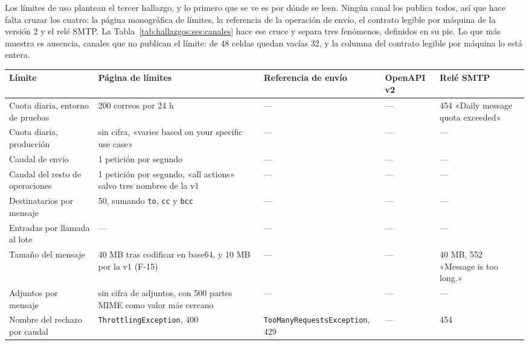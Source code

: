 Los límites de uso plantean el tercer hallazgo, y lo primero que se ve es por
dónde se leen. Ningún canal los publica todos, así que hace falta cruzar los
cuatro: la página monográfica de límites, la referencia de la operación de
envío, el contrato legible por máquina de la versión 2 y el relé SMTP. La
Tabla~\ref{tab:hallazgos:ses:canales} hace ese cruce y separa tres fenómenos,
definidos en su pie. Lo que más muestra es ausencia, canales que no publican
el límite: de 48 celdas quedan vacías 32, y la columna del contrato legible
por máquina lo está entera.

\begin{table}[H]
\centering
\scriptsize
\setlength{\tabcolsep}{3pt}
\renewcommand{\arraystretch}{1.15}
\begin{tabular}{|p{}|p{}|p{}|p{}|p{}|}
\hline
\raggedright \textbf{Límite} & \raggedright \textbf{Página de límites} & \raggedright \textbf{Referencia de envío} & \raggedright \textbf{OpenAPI v2} & \raggedright \textbf{Relé SMTP} \tabularnewline
\hline
\raggedright Cuota diaria, entorno de pruebas & \raggedright 200 correos por 24 h & \raggedright --- & \raggedright --- & \raggedright 454 «Daily message quota exceeded» \tabularnewline
\hline
\raggedright Cuota diaria, producción & \raggedright sin cifra, «varies based on your specific use case» & \raggedright --- & \raggedright --- & \raggedright --- \tabularnewline
\hline
\raggedright Caudal de envío & \raggedright 1 petición por segundo & \raggedright --- & \raggedright --- & \raggedright --- \tabularnewline
\hline
\raggedright Caudal del resto de operaciones & \raggedright 1 petición por segundo, «all actions» salvo tres nombres de la v1 & \raggedright --- & \raggedright --- & \raggedright --- \tabularnewline
\hline
\raggedright Destinatarios por mensaje & \raggedright 50, sumando \texttt{to}, \texttt{cc} y \texttt{bcc} & \raggedright --- & \raggedright --- & \raggedright --- \tabularnewline
\hline
\raggedright Entradas por llamada al lote & \raggedright --- & \raggedright --- & \raggedright --- & \raggedright --- \tabularnewline
\hline
\raggedright Tamaño del mensaje & \raggedright 40 MB tras codificar en base64, y 10 MB por la v1 (F-15) & \raggedright --- & \raggedright --- & \raggedright 40 MB, 552 «Message is too long.» \tabularnewline
\hline
\raggedright Adjuntos por mensaje & \raggedright sin cifra de adjuntos, con 500 partes MIME como valor más cercano & \raggedright --- & \raggedright --- & \raggedright --- \tabularnewline
\hline
\raggedright Nombre del rechazo por caudal & \raggedright \texttt{Throttling\allowbreak Exception}, 400 & \raggedright \texttt{TooMany\allowbreak RequestsException}, 429 & \raggedright --- & \raggedright 454 \tabularnewline

\end{tabular}
\end{table}
